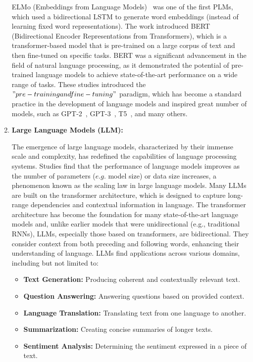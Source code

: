 \begin{enumerate}
{    ELMo (Embeddings from Language Models)~\cite{elmo} was one of the first PLMs, which used a bidirectional LSTM to generate word embeddings (instead of learning fixed word representations).
    The work \cite{bert} introduced BERT (Bidirectional Encoder Representations from Transformers), which is a transformer-based model that is pre-trained on a large corpus of text and then fine-tuned on specific tasks.
    BERT was a significant advancement in the field of natural language processing, as it demonstrated the potential of pre-trained language models to achieve state-of-the-art performance on a wide range of tasks.
    These studies introduced the $"pre-training and fine-tuning"$ paradigm, which has become a standard practice in the development of language models and inspired great number of models, such as GPT-2~\cite{gpt2}, GPT-3~\cite{gpt3}, T5~\cite{t5}, and many others.
    }
    \item \textbf{Large Language Models (LLM):} {The emergence of large language models, characterized by their immense scale and complexity, has redefined the capabilities of language processing systems.
    Studies find that the performance of language models improves as the number of parameters ($e.g.$ model size) or data size increases, a phenomenon known as the scaling law in large language models.
    Many LLMs are built on the transformer architecture, which is designed to capture long-range dependencies and contextual information in language.
    The transformer architecture has become the foundation for many state-of-the-art language models and, unlike earlier models that were unidirectional (e.g., traditional RNNs), LLMs, especially those based on transformers, are bidirectional. They consider context from both preceding and following words, enhancing their understanding of language.
    LLMs find applications across various domains, including but not limited to:
        \begin{itemize}
            \item \textbf{Text Generation:} Producing coherent and contextually relevant text.
            \item \textbf{Question Answering:} Answering questions based on provided context.
            \item \textbf{Language Translation:} Translating text from one language to another.
            \item \textbf{Summarization:} Creating concise summaries of longer texts.
            \item \textbf{Sentiment Analysis:} Determining the sentiment expressed in a piece of text.

\end{itemize}}
\end{enumerate}
